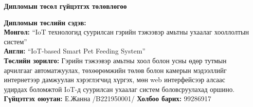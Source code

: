 \documentclass[12pt,a4paper]{report}
\begin{document}
\begin{center}
  {\large\textbf{Дипломын төсөл гүйцэтгэх төлөвлөгөө}}
\end{center}
\vspace{0.3cm}
\small
\noindent\textbf{Дипломын төслийн сэдэв:}\\
\textbf{Монгол:} ``IoT технологид суурилсан гэрийн тэжээвэр амьтны ухаалаг хооллолтын систем''\\
\textbf{Англи:} ``IoT-based Smart Pet Feeding System''\\[6pt]

\noindent\textbf{Төслийн зорилго:} Гэрийн тэжээвэр амьтны хоол болон усны өдөр тутмын арчилгааг автоматжуулах, төхөөрөмжийн төлөв болон камерын мэдээллийг интернетээр дамжуулан хэрэглэгчид хүргэх, мөн web интерфейсээр алсаас удирдах боломжтой IoT-д суурилсан ухаалаг систем боловсруулахад оршино.\\[6pt]

\noindent\textbf{Гүйцэтгэх оюутан:} Е.Жанна /B221950001/
\hfill \textbf{Холбоо барих:} 99286917
\vspace{0.4cm}
\end{document}
